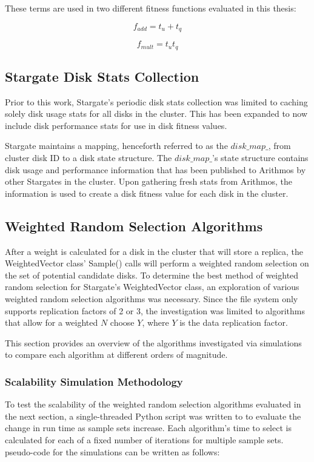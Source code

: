 \documentclass[12pt]{article}
\begin{document}
  These terms are used in two different fitness functions evaluated in this
  thesis:

  \begin{equation}
    f_{add} = t_{u} + t_{q}
  \end{equation}

  \begin{equation}
    f_{mult} = t_{u}t_{q}
  \end{equation}


  \subsection{Stargate Disk Stats Collection}

  Prior to this work, Stargate's periodic disk stats collection was limited to
  caching solely disk usage stats for all disks in the cluster. This has been
  expanded to now include disk performance stats for use in disk fitness
  values.

  Stargate maintains a mapping, henceforth referred to as the $disk\_map\_$,
  from cluster disk ID to a disk state structure. The $disk\_map\_$'s state
  structure contains disk usage and performance information that has been
  published to Arithmos by other Stargates in the cluster. Upon gathering fresh
  stats from Arithmos, the information is used to create a disk fitness value
  for each disk in the cluster.

  \subsection{Weighted Random Selection Algorithms}

  After a weight is calculated for a disk in the cluster that will store a
  replica, the WeightedVector class' Sample() calls will perform a weighted
  random selection on the set of potential candidate disks. To determine the
  best method of weighted random selection for Stargate's WeightedVector class,
  an exploration of various weighted random selection algorithms was necessary.
  Since the file system only supports replication factors of 2 or 3, the
  investigation was limited to algorithms that allow for a weighted $N$ choose
  $Y$, where $Y$ is the data replication factor.

  This section provides an overview of the algorithms investigated via
  simulations to compare each algorithm at different orders of magnitude.

    \subsubsection{Scalability Simulation Methodology}
     To test the scalability of the weighted random selection algorithms
     evaluated in the next section, a single-threaded Python \cite{python}
     script was written to to evaluate the change in run time as sample sets
     increase. Each algorithm's time to select is calculated for each of a
     fixed number of iterations for multiple sample sets. pseudo-code for the
     simulations can be written as follows:
\end{document}
